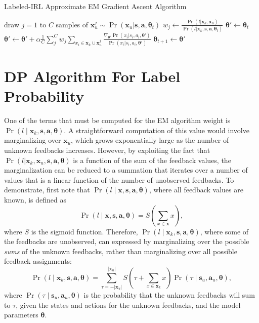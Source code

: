 \documentclass{article}
\begin{document}
\begin{algorithm}
\caption{Labeled-IRL Approximate EM Gradient Ascent Algorithm}
\begin{algorithmic}
\State draw $j =1$ to $C$ samples of $\bm{x}_u^j \sim \Pr(\bm{x}_u | \bm{s}, \bm{a}, \bm{\theta}_t)$ 
\State $w_j \gets \frac{\Pr(l | \bm{x}_k, \bm{x}_u)}{\Pr(l | \bm{x}_k, \bm{s}, \bm{a}, \bm{\theta}_t)}$ 
\EndFor
\State $\bm{\theta}' \gets \bm{\theta}_t$
 
\State $\bm{\theta}' \gets \bm{\theta}' + \alpha \frac{1}{C} \sum_j^C w_j \sum_{x_i \in \bm{x}_k \cup \bm{x}_u^j} \frac{\nabla_{\bm{\theta}'} \Pr(x_i | s_i, a_i, \bm{\theta}')}{\Pr(x_i | s_i, a_i, \bm{\theta}')} $
\EndFor
\State $\bm{\theta}_{t+1} \gets \bm{\theta}'$
\EndFor
\end{algorithmic}
\end{algorithm}

\section{DP Algorithm For Label Probability}
One of the terms that must be computed for the EM algorithm weight is $\Pr(l \mid \bm{x}_k, \bm{s}, \bm{a}, \bm{\theta})$. A straightforward computation of this value would involve marginalizing over $\bm{x}_u$, which grows exponentially large as the number of unknown feedbacks increases. However, by exploiting the fact that $\Pr(l | \bm{x}_k, \bm{x}_u, \bm{s}, \bm{a}, \bm{\theta})$ is a function of the sum of the feedback values, the marginalization can be reduced to a summation that iterates over a number of values that is a linear function of the number of unobserved feedbacks. To demonstrate, first note that $\Pr(l \mid \bm{x}, \bm{s}, \bm{a}, \bm{\theta})$, where all feedback values are known, is defined as
\begin{equation}
\Pr(l \mid \bm{x}, \bm{s}, \bm{a}, \bm{\theta}) = S\left(\sum_{x \in \bm{x}} x \right),
\end{equation} 
where $S$ is the sigmoid function. Therefore, $\Pr(l \mid \bm{x}_k, \bm{s}, \bm{a}, \bm{\theta})$, where some of the feedbacks are unobserved, can expressed by marginalizing over the possible {\em sums} of the unknown feedbacks, rather than marginalizing over all possible feedback assignments:
\begin{equation}
\Pr(l \mid \bm{x}_k, \bm{s}, \bm{a}, \bm{\theta}) = \sum_{\tau = -|\bm{x}_u|}^{|\bm{x}_u|} S\left(\tau + \sum_{x \in \bm{x}_k} x\right) \Pr(\tau \mid \bm{s}_u, \bm{a}_u, \bm{\theta}),
\end{equation}
where $\Pr(\tau \mid \bm{s}_u, \bm{a}_u, \bm{\theta})$ is the probability that the unknown feedbacks will sum to $\tau$, given the states and actions for the unknown feedbacks, and the model parameters $\bm{\theta}$.
\end{document}
